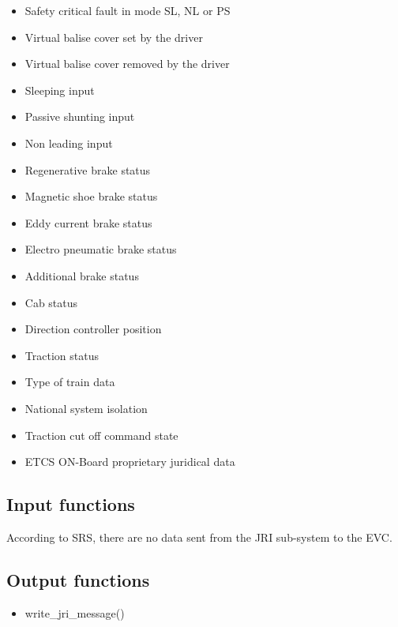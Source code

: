 \documentclass{template/openetcs_article}
\begin{document}
\begin{itemize}
			\item Safety critical fault in mode SL, NL or PS
			\item Virtual balise cover set by the driver
			\item Virtual balise cover removed by the driver
			\item Sleeping input
			\item Passive shunting input
			\item Non leading input
			\item Regenerative brake status
			\item Magnetic shoe brake status
			\item Eddy current brake status
			\item Electro pneumatic brake status
			\item Additional brake status
			\item Cab status
			\item Direction controller position
			\item Traction status
			\item Type of train data
			\item National system isolation
			\item Traction cut off command state
			\item ETCS ON-Board proprietary juridical data
		\end{itemize}
		
	\subsection{Input functions}
		According to SRS, there are no data sent from the JRI sub-system to the EVC.
	\subsection{Output functions}
		\begin{itemize}
			\item write\_jri\_message()
		\end{itemize}

\end{document}
